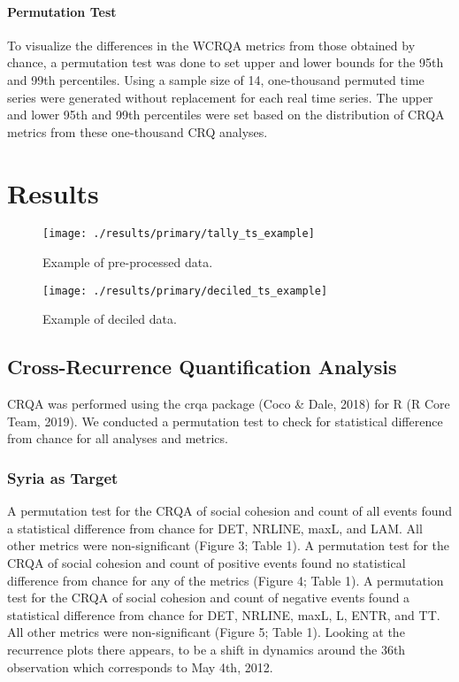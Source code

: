 \documentclass[english,man]{apa6}
\begin{document}
\hypertarget{permutation-test-1}{%
\paragraph{Permutation Test}\label{permutation-test-1}}

To visualize the differences in the WCRQA metrics from those obtained by chance, a permutation test was done to set upper and lower bounds for the 95th and 99th percentiles. Using a sample size of 14, one-thousand permuted time series were generated without replacement for each real time series. The upper and lower 95th and 99th percentiles were set based on the distribution of CRQA metrics from these one-thousand CRQ analyses.

\hypertarget{results}{%
\section{Results}\label{results}}

\begin{figure}
\texttt{[image: ./results/primary/tally\_ts\_example]} \caption{Example of pre-processed data.}\label{fig:raw-ts}
\end{figure}

\begin{figure}
\texttt{[image: ./results/primary/deciled\_ts\_example]} \caption{Example of deciled data.}\label{fig:deciled-ts}
\end{figure}

\hypertarget{cross-recurrence-quantification-analysis-1}{%
\subsection{Cross-Recurrence Quantification Analysis}\label{cross-recurrence-quantification-analysis-1}}

CRQA was performed using the crqa package (Coco \& Dale, 2018) for R (R Core Team, 2019). We conducted a permutation test to check for statistical difference from chance for all analyses and metrics.

\hypertarget{syria-as-target}{%
\subsubsection{Syria as Target}\label{syria-as-target}}

A permutation test for the CRQA of social cohesion and count of all events found a statistical difference from chance for DET, NRLINE, maxL, and LAM. All other metrics were non-significant (Figure 3; Table 1). A permutation test for the CRQA of social cohesion and count of positive events found no statistical difference from chance for any of the metrics (Figure 4; Table 1). A permutation test for the CRQA of social cohesion and count of negative events found a statistical difference from chance for DET, NRLINE, maxL, L, ENTR, and TT. All other metrics were non-significant (Figure 5; Table 1). Looking at the recurrence plots there appears, to be a shift in dynamics around the 36th observation which corresponds to May 4th, 2012.
\end{document}
